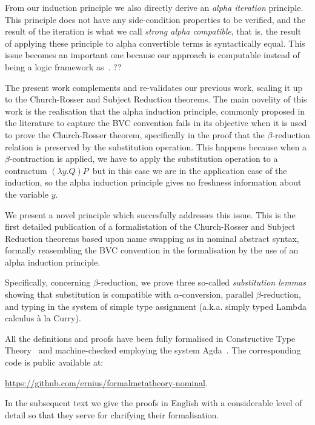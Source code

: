 \documentclass[preprint,10pt]{sigplanconf}
\newcommand{\lam}{\ensuremath{\lambda}}
\begin{document}
From our induction principle we also directly derive an \emph{alpha iteration} principle. 
This principle does not have any side-condition properties to be verified, and the result of the iteration is what we call \emph{strong alpha compatible}, that is, the result of applying these principle to alpha convertible terms is syntactically equal. 
This issue becomes an important one because our approach is computable instead of being a logic framework as~\cite{urban05}.  ??

The present work complements and re-validates our previous work, scaling it up to the Church-Rosser and Subject Reduction theorems. 
The main novelity of this work is the realisation that the alpha induction principle, commonly proposed in the literature to capture the BVC convention fails in its objective when it is used to prove the Church-Rosser theorem, specifically in the proof that the $\beta$-reduction relation is preserved by the substitution operation. 
This happens because when a $\beta$-contraction is applied, we have to apply the substitution operation to a contractum $(\lam y . Q) P$\ but in this case we are in the application case of the induction, so the alpha induction principle gives no freshness information about the variable $y$.

We present a novel principle which succesfully addresses this issue. 
This is the first detailed publication of a formalistation of the Church-Rosser and Subject Reduction theorems based upon name swapping as in nominal abstract syntax, formally reasembling the BVC convention in the formalisation by the use of an alpha induction principle.

Specifically, concerning $\beta$-reduction, we prove three so-called \emph{substitution lemmas} showing that substitution is compatible with $\alpha$-conversion, parallel $\beta$-reduction, and typing in the system of simple type assignment (a.k.a. simply typed Lambda calculus \`a la Curry).


All the definitions and proofs have been fully formalised in Constructive Type Theory~\cite{mlof} and machine-checked employing the system Agda~\cite{agda}. The corresponding code is public available at:

 \href{github}{https://github.com/ernius/formalmetatheory-nominal}. 

In the subsequent text we give the proofs in English with a considerable level of detail so that they serve for clarifying their formalisation. 
\\
\end{document}
